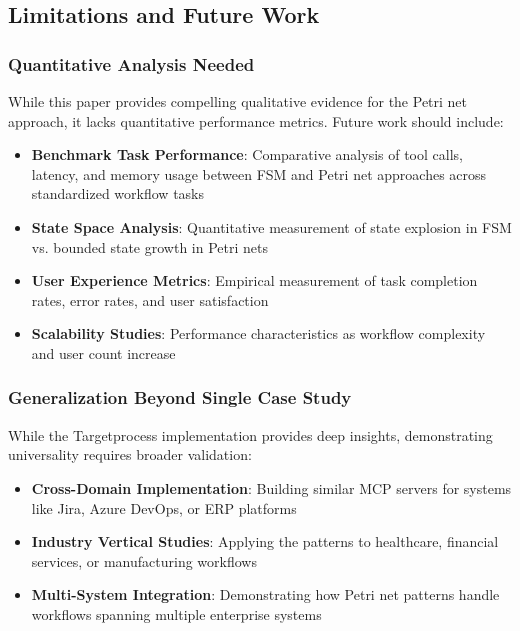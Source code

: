 \documentclass[11pt,a4paper]{article}
\begin{document}
\subsection{Limitations and Future Work}

\subsubsection{Quantitative Analysis Needed}

While this paper provides compelling qualitative evidence for the Petri net approach, it lacks quantitative performance metrics. Future work should include:

\begin{itemize}
\item \textbf{Benchmark Task Performance}: Comparative analysis of tool calls, latency, and memory usage between FSM and Petri net approaches across standardized workflow tasks
\item \textbf{State Space Analysis}: Quantitative measurement of state explosion in FSM vs. bounded state growth in Petri nets
\item \textbf{User Experience Metrics}: Empirical measurement of task completion rates, error rates, and user satisfaction
\item \textbf{Scalability Studies}: Performance characteristics as workflow complexity and user count increase
\end{itemize}

\subsubsection{Generalization Beyond Single Case Study}

While the Targetprocess implementation provides deep insights, demonstrating universality requires broader validation:

\begin{itemize}
\item \textbf{Cross-Domain Implementation}: Building similar MCP servers for systems like Jira, Azure DevOps, or ERP platforms
\item \textbf{Industry Vertical Studies}: Applying the patterns to healthcare, financial services, or manufacturing workflows
\item \textbf{Multi-System Integration}: Demonstrating how Petri net patterns handle workflows spanning multiple enterprise systems
\end{itemize}
\end{document}
